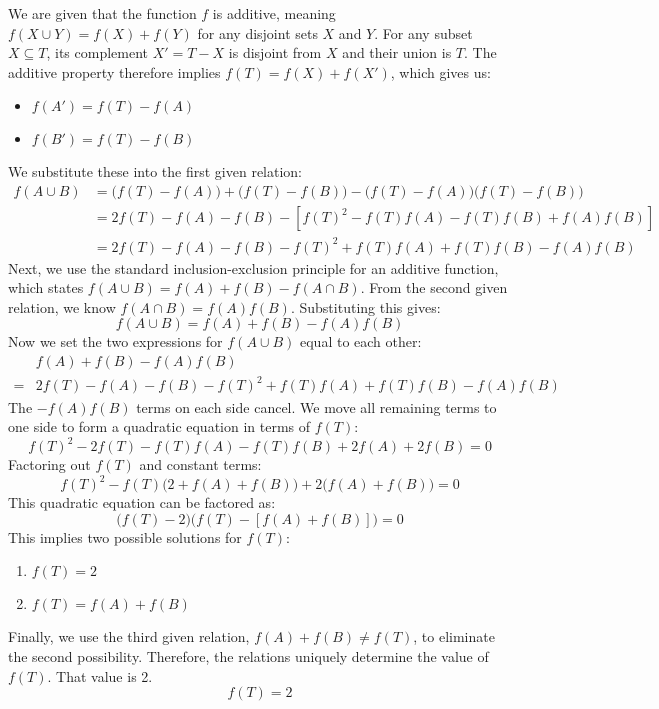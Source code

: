 We are given that the function \(f\) is additive, meaning \(f(X \cup Y) = f(X) + f(Y)\) for any disjoint sets \(X\) and \(Y\). For any subset \(X \subseteq T\), its complement \(X' = T - X\) is disjoint from \(X\) and their union is \(T\). The additive property therefore implies \(f(T) = f(X) + f(X')\), which gives us:
\begin{itemize}
\item \(f(A') = f(T) - f(A)\)
\item \(f(B') = f(T) - f(B)\)
\end{itemize}
We substitute these into the first given relation:
\begin{align*}
f(A \cup B) &= \big(f(T) - f(A)\big) + \big(f(T) - f(B)\big) - \big(f(T) - f(A)\big)\big(f(T) - f(B)\big) \\
&= 2f(T) - f(A) - f(B) - \left[ f(T)^2 - f(T)f(A) - f(T)f(B) + f(A)f(B) \right] \\
&= 2f(T) - f(A) - f(B) - f(T)^2 + f(T)f(A) + f(T)f(B) - f(A)f(B)
\end{align*}
Next, we use the standard inclusion-exclusion principle for an additive function, which states \(f(A \cup B) = f(A) + f(B) - f(A \cap B)\). From the second given relation, we know \(f(A \cap B) = f(A)f(B)\). Substituting this gives:
\[
f(A \cup B) = f(A) + f(B) - f(A)f(B)
\]
Now we set the two expressions for \(f(A \cup B)\) equal to each other:
\begin{align*}
&f(A) + f(B) - f(A)f(B) \\
=& 2f(T) - f(A) - f(B) - f(T)^2 + f(T)f(A) + f(T)f(B) - f(A)f(B)
\end{align*}
The \( -f(A)f(B) \) terms on each side cancel. We move all remaining terms to one side to form a quadratic equation in terms of \(f(T)\):
\[
f(T)^2 - 2f(T) - f(T)f(A) - f(T)f(B) + 2f(A) + 2f(B) = 0
\]
Factoring out \(f(T)\) and constant terms:
\[
f(T)^2 - f(T)\big(2 + f(A) + f(B)\big) + 2\big(f(A) + f(B)\big) = 0
\]
This quadratic equation can be factored as:
\[
\big(f(T) - 2\big) \big(f(T) - [f(A) + f(B)]\big) = 0
\]
This implies two possible solutions for \(f(T)\):
\begin{enumerate}
\item \(f(T) = 2\)
\item \(f(T) = f(A) + f(B)\)
\end{enumerate}
Finally, we use the third given relation, \(f(A) + f(B) \ne f(T)\), to eliminate the second possibility.
Therefore, the relations uniquely determine the value of \(f(T)\). That value is 2.
\[
\boxed{f(T) = 2}
\]

